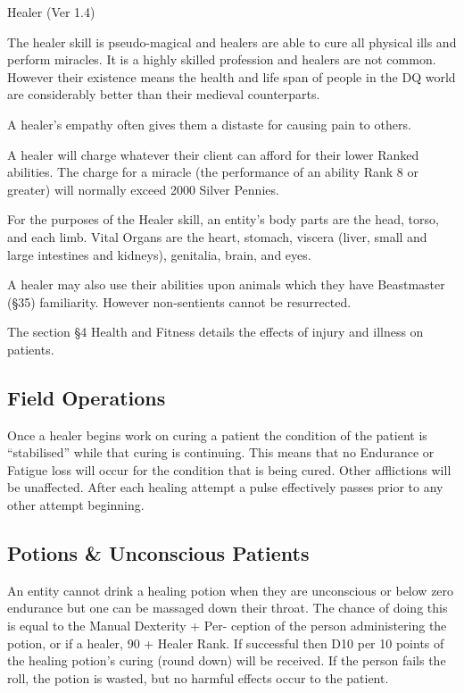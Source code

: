 \begin{Chapter}{Healer (Ver 1.4)}

The healer skill is pseudo-magical and healers are able to cure all
physical ills and perform miracles.  It is a highly skilled profession
and healers are not common.  However their existence means the health
and life span of people in the DQ world are considerably better than
their medieval counterparts.

A healer’s empathy often gives them a distaste for causing pain to
others.

A healer will charge whatever their client can afford for their lower
Ranked abilities.  The charge for a miracle (the performance of an
ability Rank 8 or greater) will normally exceed 2000 Silver Pennies.

For the purposes of the Healer skill, an entity’s body parts are the
head, torso, and each limb.  Vital Organs are the heart, stomach,
viscera (liver, small and large intestines and kidneys), genitalia,
brain, and eyes.

A healer may also use their abilities upon animals which they have
Beastmaster (§35) familiarity.  However non-sentients cannot be
resurrected.

The section §4 Health and Fitness details the effects of injury and
illness on patients.

\subsection{Field Operations}

Once a healer begins work on curing a patient the condition of the
patient is “stabilised” while that curing is continuing. This means
that no Endurance or Fatigue loss will occur for the condition that is
being cured.  Other afflictions will be unaffected.  After each
healing attempt a pulse effectively passes prior to any other attempt
beginning.

\subsection{Potions \& Unconscious Patients}

An entity cannot drink a healing potion when they are unconscious or
below zero endurance but one can be massaged down their throat. The
chance of doing this is equal to the Manual Dexterity + Per- ception
of the person administering the potion, or if a healer, 90 + Healer
Rank. If successful then D10 per 10 points of the healing potion’s
curing (round down) will be received. If the person fails the roll,
the potion is wasted, but no harmful effects occur to the patient.


\end{Chapter}
